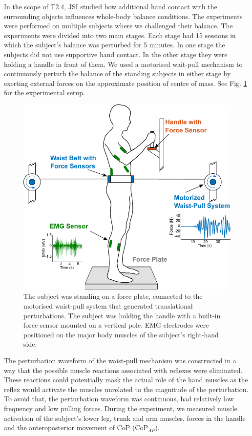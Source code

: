 In the scope of T2.4, JSI studied how additional hand contact with the surrounding objects influences whole-body balance conditions. The experiments were performed on multiple subjects where we challenged their balance. The experiments were divided into two main stages. Each stage had 15 sessions in which the subject's balance was perturbed for 5 minutes. In one stage the subjects did not use supportive hand contact. In the other stage they were holding a handle in front of them. We used a motorised wait-pull mechanism \cite{Peternel2013} to continuously perturb the balance of the standing subjects in either stage by exerting external forces on the approximate position of centre of mass. See Fig. \ref{fig:exp2_protocol} for the experimental setup.

\begin{figure}[!t]
	\begin{center}
		\includegraphics[width=\linewidth]{images/exp2_protocol.pdf}
		\caption{The subject was standing on a force plate, connected to the motorised waist-pull system that generated translational perturbations. The subject was holding the handle with a built-in force sensor mounted on a vertical pole. EMG electrodes were positioned on the major body muscles of the subject's right-hand side.}
		\label{fig:exp2_protocol}
	\end{center}
\end{figure}

The perturbation waveform of the waist-pull mechanism was constructed in a way that the possible muscle reactions associated with reflexes were eliminated. These reactions could potentially mask the actual role of the hand muscles as the reflex would activate the muscles unrelated to the magnitude of the perturbation. To avoid that, the perturbation waveform was continuous, had relatively low frequency and low pulling forces. During the experiment, we measured muscle activation of the subject's lower leg, trunk and arm muscles, forces in the handle and the anteroposterior movement of CoP (CoP$_{AP}$).

